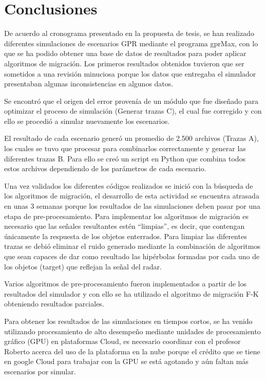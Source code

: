 \section{Conclusiones}

De acuerdo al cronograma presentado en la propuesta de tesis, se han realizado diferentes simulaciones de escenarios GPR mediante el programa gprMax, con lo que se ha podido obtener una base de datos de resultados para poder aplicar algoritmos de migración. Los primeros resultados obtenidos tuvieron que ser sometidos a una revisión minuciosa porque los datos que entregaba el simulador presentaban algunas inconsistencias en algunos datos. 

Se encontró que el origen del error provenía de un módulo que fue diseñado para optimizar el proceso de simulación (Generar trazas C), el cual fue corregido y con ello se procedió a simular nuevamente los escenarios.

El resultado de cada escenario generó un promedio de 2.500 archivos (Trazas A), los cuales se tuvo que procesar para combinarlos correctamente y generar las diferentes trazas B. Para ello se creó un script en Python que combina todos estos archivos dependiendo de los parámetros de cada escenario.

Una vez validados los diferentes códigos realizados se inició con la búsqueda de los algoritmos de migración, el desarrollo de esta actividad se encuentra atrasada en unas 3 semanas porque los resultados de las simulaciones deben pasar por una etapa de pre-procesamiento. Para implementar los algoritmos de migración es necesario que las señales resultantes estén “limpias”, es decir, que contengan únicamente la respuesta de los objetos enterrados. Para limpiar las diferentes trazas se debió eliminar el ruido generado mediante la combinación de algoritmos que sean capaces de dar como resultado las hipérbolas formadas por cada uno de los objetos (target) que reflejan la señal del radar.

Varios algoritmos de pre-procesamiento fueron implementados a partir de los resultados del simulador y con ello se ha utilizado el algoritmo de migración F-K obteniendo resultados parciales.

Para obtener los resultados de las simulaciones en tiempos cortos, se ha venido utilizando procesamiento de alto desempeño mediante unidades de procesamiento gráfico (GPU) en plataformas Cloud, es necesario coordinar con el profesor Roberto acerca del uso de la plataforma en la nube porque el crédito que se tiene en google Cloud para trabajar con la GPU se está agotando y aún faltan más escenarios por simular.